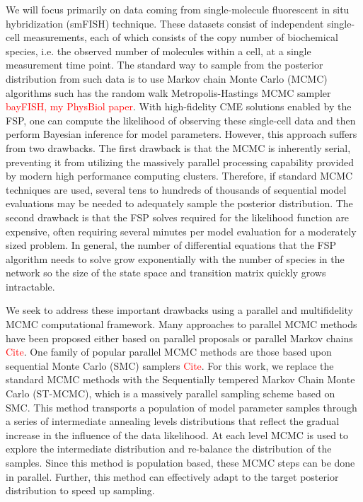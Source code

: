 \documentclass[1p]{article}
\begin{document}
We will focus primarily on data coming from single-molecule fluorescent in situ hybridization (smFISH) technique. These datasets consist of independent single-cell measurements, each of which consists of the copy number of biochemical species, i.e. the observed number of molecules within a cell, at a single measurement time point.
%
The standard way to sample from the posterior distribution from such data is to use Markov chain Monte Carlo (MCMC) algorithms such has the random walk Metropolis-Hastings MCMC sampler \textcolor{red}{bayFISH, my PhysBiol paper}.
With high-fidelity CME solutions enabled by the FSP, one can compute the likelihood of observing these single-cell data and then perform Bayesian inference for model parameters.
However, this approach suffers from two drawbacks. The first drawback is that the MCMC is inherently serial, preventing it from utilizing the massively parallel processing capability provided by modern high performance computing clusters. Therefore, if standard MCMC techniques are used, several tens to hundreds of thousands of sequential model evaluations may be needed to adequately sample the posterior distribution. The second drawback is that the FSP solves required for the likelihood function are expensive, often requiring several minutes per model evaluation for a moderately sized problem. In general, the number of differential equations that the FSP algorithm needs to solve grow exponentially with the number of species in the network so the size of the state space and transition matrix quickly grows intractable.

We seek to address these important drawbacks using a parallel and multifidelity MCMC computational framework. Many approaches to parallel MCMC methods have been proposed either based on parallel proposals or parallel Markov chains \textcolor{red}{Cite}. One family of popular parallel MCMC methods are those based upon sequential Monte Carlo (SMC) samplers \textcolor{red}{Cite}. For this work, we replace the standard MCMC methods with the Sequentially tempered Markov Chain Monte Carlo (ST-MCMC), which is a massively parallel sampling scheme based on SMC. This method transports a population of model parameter samples through a series of intermediate annealing levels distributions that reflect the gradual increase in the influence of the data likelihood. At each level MCMC is used to explore the intermediate distribution and re-balance the distribution of the samples. Since this method is population based, these MCMC steps can be done in parallel. Further, this method can effectively adapt to the target posterior distribution to speed up sampling.
\end{document}

